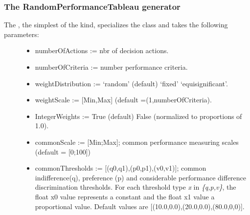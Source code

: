 \documentclass[letterpaper,10pt,english]{sphinxmanual}
\begin{document}
\subsubsection{The RandomPerformanceTableau generator}
\label{tutorial:the-randomperformancetableau-generator}\begin{description}
\item[{The , the simplest of the kind, specializes the  class and takes the following parameters:}] \leavevmode\begin{itemize}
\item {} 
numberOfActions := nbr of decision actions.

\item {} 
numberOfCriteria := number performance criteria.

\item {} \begin{description}
\item[{weightDistribution := `random' (default) \textbar{} `fixed' \textbar{} `equisignificant'.}] \leavevmode
{}

\end{description}

\item {} 
weightScale := {[}Min,Max{]} (default =(1,numberOfCriteria).

\item {} 
IntegerWeights := True (default) \textbar{} False (normalized to proportions of 1.0).

\item {} 
commonScale := {[}Min;Max{]}; common performance measuring scales (default = {[}0;100{]})

\item {} 
commonThresholds := {[}(q0,q1),(p0,p1),(v0,v1){]}; common indifference(q), preference (p) and considerable performance difference discrimination thresholds. For each threshold type \emph{x} in \emph{\{q,p,v\}}, the float x0 value represents a constant and the float x1 value a proportional value. Default values are {[}(10.0,0.0),(20.0,0.0),(80.0,0,0){]}.


\end{itemize}
\end{description}
\end{document}
